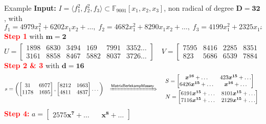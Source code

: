\documentclass[final]{beamer}
\newlength{\twocolwid}
\begin{document}
\begin{frame}[t]
\begin{columns}[t]
\begin{column}{\twocolwid}
        \begin{alertblock}{{\sf Example}}
		\textbf{Input: }$I = \langle f_1^2, f_2^2,f_3 \rangle \subset \mathbb{F}_{9001}[x_1,x_2,x_3]$,
                non radical
                of degree $\boldsymbol{D=32}$,
                with
		$$ f_1 = 4979x_1^2 + 6202x_1x_2 + \dots, \;
		   f_2 = 4682x_1^2 + 8290x_1x_2 + \dots, \;
		   f_3 = 4199x_1^2 + 2325x_1x_2 + \dots$$
		\textcolor{red}{\bf Step 1} with $\boldsymbol{m = 2}$
		$$ U = \begin{bmatrix}
		1898 &6830 &3494 & 169 &7991 &3352 \dots \\
		3161 &8858 &8467 &5882 &8037 &3726 \dots
		\end{bmatrix} \quad
		V = \begin{bmatrix}
		7595 &8416 &2285 &8351 & 550 &7012 \dots \\
		823 &5686 &6539 &7884 &7105 &3427 \dots 
		\end{bmatrix}^t
		$$
		\textcolor{red}{\bf Step 2 \& 3} with $\boldsymbol{d = 16}$
		$$ s = \left(
		\begin{bmatrix}
		31  & 6977\\
		1178& 1695
		\end{bmatrix},
		\begin{bmatrix}
		8212&1663\\
		4811&4837
		\end{bmatrix}
		\dots
		\right)\,
                ~~\xRightarrow{\mathsf{MatrixBerlekampMassey}}~~
                \begin{array}{l}
		S = \begin{bmatrix}
		\boldsymbol{x^{16}} + \dots & 423\boldsymbol{x^{15}} +\dots\\
		6426\boldsymbol{x^{15}}+ \dots & \boldsymbol{x^{16}} + \dots
		\end{bmatrix} \, \\[1em]
		N = \begin{bmatrix}
		6191\boldsymbol{x^{15}} + \dots & 8101\boldsymbol{x^{15}} + \dots\\
		7116\boldsymbol{x^{15}} + \dots & 2129\boldsymbol{x^{15}} + \dots
		\end{bmatrix}
                \end{array}
		$$
		\textcolor{red}{\bf Step 4:}
		$%
                a = \begin{bmatrix}
		2575\boldsymbol{x^7}+\dots ~~&~~ \boldsymbol{x^8} + \dots
		\end{bmatrix}$


\end{alertblock}
\end{column}
\end{columns}
\end{frame}
\end{document}

